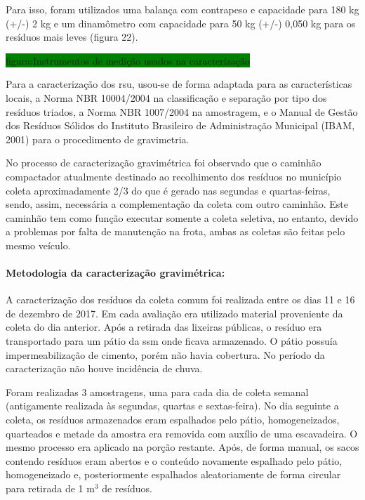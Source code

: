 	Para isso, foram utilizados uma balança com contrapeso e capacidade para 180 kg (+/-) 2 kg e um dinamômetro com capacidade para 50 kg (+/-) 0,050 kg para os resíduos mais leves (figura 22).
	
	\colorbox{green}{figura:Instrumentos de medição usados na caracterização}
	
	Para a caracterização dos \gls{rsu}, usou-se de forma adaptada para as características locais, a Norma NBR 10004/2004 na classificação e separação por tipo dos resíduos triados, a Norma NBR 1007/2004 na amostragem, e o Manual de Gestão dos Resíduos Sólidos do Instituto Brasileiro de Administração Municipal (IBAM, 2001) para o procedimento de gravimetria.
	
	No processo de caracterização gravimétrica foi observado que o caminhão compactador atualmente destinado ao recolhimento dos resíduos no município coleta aproximadamente 2/3 do que é gerado nas segundas e quartas-feiras, sendo, assim, necessária a complementação da coleta com outro caminhão. Este caminhão tem como função executar somente a coleta seletiva, no entanto, devido a problemas por falta de manutenção na frota, ambas as coletas são feitas pelo mesmo veículo.
	
	\paragraph{\textbf{Metodologia da caracterização gravimétrica:}}
	
	A caracterização dos resíduos da coleta comum foi realizada entre os dias 11 e 16 de dezembro de 2017. Em cada avaliação era utilizado material proveniente da coleta do dia anterior. Após a retirada das lixeiras públicas, o resíduo era transportado para um pátio da \gls{ssm} onde ficava armazenado. O pátio possuía impermeabilização de cimento, porém não havia cobertura. No período da caracterização não houve incidência de chuva.
	
	Foram realizadas 3 amostragens, uma para cada dia de coleta semanal (antigamente realizada às segundas, quartas e sextas-feira). No dia seguinte a coleta, os resíduos armazenados eram espalhados pelo pátio, homogeneizados, quarteados e metade da amostra era removida com auxílio de uma escavadeira. O mesmo processo era aplicado na porção restante. Após, de forma manual, os sacos contendo resíduos eram abertos e o conteúdo novamente espalhado pelo pátio, homogeneizado e, posteriormente espalhados aleatoriamente de forma circular para retirada de 1 m$^{3}$ de resíduos.
	
